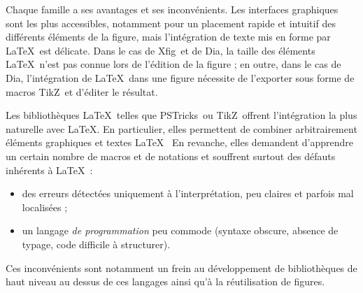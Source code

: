 \documentclass[twoside]{studia-Hermann}
\newcommand{\nomdetikz}{\textsf{TikZ}}
\newcommand{\pstricks}{\textsf{PSTricks}}
\newcommand{\dia}{\textsf{Dia}}
\newcommand{\xfig}{\textsf{Xfig}}
\begin{document}

Chaque famille a ses avantages et ses inconvénients. Les interfaces
graphiques sont les plus accessibles, notamment pour un placement
rapide et intuitif des différents éléments de la figure, mais
l'intégration de texte mis en forme par \LaTeX\ est délicate. Dans le
cas de \xfig\ et de \dia, la taille des éléments \LaTeX\ n'est pas
connue lors de l'édition de la figure ; en outre, dans le cas de \dia,
l'intégration de \LaTeX\ dans une figure nécessite de l'exporter sous
forme de macros \nomdetikz\ et d'éditer le résultat.

Les bibliothèques \LaTeX\ telles que \pstricks\ ou \nomdetikz\ offrent
l'intégration la plus naturelle avec \LaTeX. En particulier, elles
permettent de combiner arbitrairement éléments graphiques et textes
\LaTeX\ 
En revanche, elles demandent d'apprendre un certain nombre de
macros et de notations et souffrent surtout des défauts inhérents à
\LaTeX~:
\begin{itemize}
\item des erreurs détectées uniquement à l'interprétation, peu claires
  et parfois mal localisées ;
\item un langage \emph{de programmation} peu commode (syntaxe obscure,
  absence de typage, code difficile à structurer).
\end{itemize}
Ces inconvénients sont notamment un frein au développement de
bibliothèques de haut niveau au dessus de ces langages ainsi qu'à la
réutilisation de figures.
\end{document}
